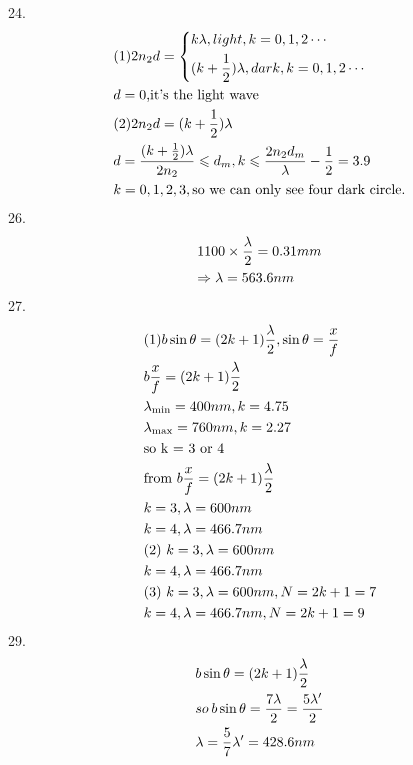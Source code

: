 \documentclass{article}
\begin{document}
24.\[\begin{gathered}
(1)2{n_2}d = \left\{ \begin{gathered}
k\lambda ,light,k = 0,1,2 \cdots  \hfill \\
(k + \frac{1}{2})\lambda ,dark,k = 0,1,2 \cdots  \hfill \\ 
\end{gathered}  \right. \hfill \\
d = 0{\text{,it's the light wave}} \hfill \\
{\text{(2)}}2{n_2}d = (k + \frac{1}{2})\lambda  \hfill \\
d = \frac{{(k + \frac{1}{2})\lambda }}{{2{n_2}}} \leqslant {d_m},k \leqslant \frac{{2{n_2}{d_m}}}{\lambda } - \frac{1}{2} = 3.9 \hfill \\
k = 0,1,2,3,{\text{so we can only see four dark circle}}{\text{.}} \hfill \\ 
\end{gathered} \]
26.\[\begin{gathered}
1100 \times \frac{\lambda }{2} = 0.31mm \hfill \\
\Rightarrow \lambda  = 563.6nm \hfill \\ 
\end{gathered} \]
27.\[\begin{gathered}
(1)b\sin \theta  = (2k + 1)\frac{\lambda }{2},\sin \theta  = \frac{x}{f} \hfill \\
b\frac{x}{f} = (2k + 1)\frac{\lambda }{2} \hfill \\
{\lambda _{\min }} = 400nm,k = 4.75 \hfill \\
{\lambda _{\max }} = 760nm,k = 2.27 \hfill \\
{\text{so k = 3 or 4}} \hfill \\
{\text{from }}b\frac{x}{f} = (2k + 1)\frac{\lambda }{2} \hfill \\
k = 3,\lambda  = 600nm \hfill \\
k = 4,\lambda  = 466.7nm \hfill \\
{\text{(2) }}k = 3,\lambda  = 600nm \hfill \\
k = 4,\lambda  = 466.7nm \hfill \\
{\text{(3) }}k = 3,\lambda  = 600nm,N = 2k + 1 = 7 \hfill \\
k = 4,\lambda  = 466.7nm,N = 2k + 1 = 9 \hfill \\ 
\end{gathered} \]
29.\[\begin{gathered}
b\sin \theta  = (2k + 1)\frac{\lambda }{2} \hfill \\
so{\kern 1pt} {\kern 1pt} b\sin \theta  = \frac{{7\lambda }}{2} = \frac{{5\lambda '}}{2} \hfill \\
\lambda  = \frac{5}{7}\lambda ' = 428.6nm \hfill \\ 
\end{gathered} \]
\end{document}
